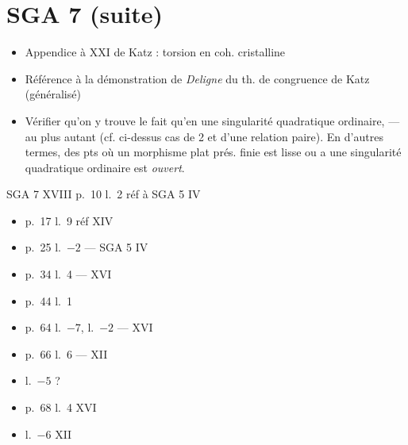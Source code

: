 \documentclass[11pt,a4paper]{article}
\begin{document}
\section*{SGA 7 (suite)}




\begin{itemize}
\item Appendice à XXI de Katz : torsion en coh. cristalline
\item[XXII] Référence à la démonstration de \emph{Deligne} du th. de
congruence de Katz (généralisé)
\item[VI \emph{ou} XIII] Vérifier qu'on y trouve le fait qu'en
 une singularité quadratique ordinaire, ---
 au plus autant (cf. ci-dessus cas de  2
et d'une relation paire). En d'autres termes,  des pts où un
morphisme plat   prés. finie est lisse ou a une
singularité quadratique ordinaire est \ill{} \emph{ouvert}.
\end{itemize}




SGA 7 XVIII \quad p.~10 l.~2 \quad réf à \struck{\ill{}}  SGA 5 IV

\begin{itemize}
\item p.~17 \quad l.~9 \quad réf  XIV
\item p.~25 \quad l.~$-2$ \quad --- SGA 5 IV
\item p.~34 \quad l.~4 \quad --- XVI
\item p.~44 \quad l.~1
\item p.~64 \quad l.~$-7$, l.~$-2$ \quad --- XVI
\item p.~66 \quad l.~6 \quad --- XII
\item l.~$-5$ \quad {} ?
\item p.~68 \quad l.~4 \quad XVI
\item l.~$-6$ \quad XII
\end{itemize}
\end{document}
